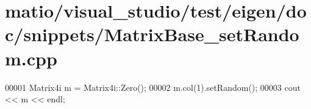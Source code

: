 \hypertarget{matio_2visual__studio_2test_2eigen_2doc_2snippets_2_matrix_base__set_random_8cpp_source}{}\section{matio/visual\+\_\+studio/test/eigen/doc/snippets/\+Matrix\+Base\+\_\+set\+Random.cpp}
\label{matio_2visual__studio_2test_2eigen_2doc_2snippets_2_matrix_base__set_random_8cpp_source}

\begin{DoxyCode}
00001 Matrix4i m = Matrix4i::Zero();
00002 m.col(1).setRandom();
00003 cout << m << endl;
\end{DoxyCode}
